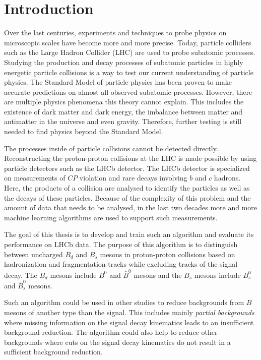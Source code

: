\chapter{Introduction}

Over the last centuries, experiments and techniques to probe physics on microscopic scales have become more and more precise.
Today, particle colliders such as the Large Hadron Collider (LHC) are used to probe subatomic processes. %
Studying the production and decay processes of subatomic particles in highly energetic particle collisions is a way to test our current understanding of particle physics.
The Standard Model of particle physics has been proven to make accurate predictions on almost all observed subatomic processes.
However, there are multiple physics phenomena this theory cannot explain.
This includes the existence of dark matter and dark energy, the imbalance between matter and antimatter in the universe and even gravity.
Therefore, further testing is still needed to find physics beyond the Standard Model.

The processes inside of particle collisions cannot be detected directly.
Reconstructing the proton-proton collisions at the LHC is made possible by using particle detectors such as the LHCb detector.
The LHCb detector is specialized on measurements of $C\!P$ violation and rare decays involving $b$ and $c$ hadrons.
Here, the products of a collision are analysed to identify the particles as well as the decays of these particles.
Because of the complexity of this problem and the amount of data that needs to be analysed, in the last two decades more and more machine learning algorithms are used to support such measurements.

The goal of this thesis is to develop and train such an algorithm and evaluate its performance on LHCb data.
The purpose of this algorithm is to distinguish between uncharged $B_d$ and $B_s$ mesons in proton-proton collisions based on hadronization and fragmentation tracks while excluding tracks of the signal decay. The $B_d$ mesons include $B^0$ and $\bar{B}^0$ mesons and the $B_s$ mesons include $B_s^0$ and $\bar{B}_s^0$ mesons.

Such an algorithm could be used in other studies to reduce backgrounds from $B$ mesons of another type than the signal. %
This includes mainly \emph{partial backgrounds} where missing information on the signal decay kinematics leads to an insufficient background reduction.
The algorithm could also help to reduce other backgrounds where cuts on the signal decay kinematics do not result in a sufficient background reduction.






















